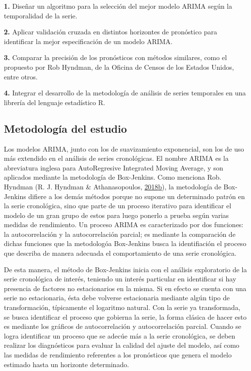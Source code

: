 \documentclass[
]{article}
\begin{document}
\textbf{1.} Diseñar un algoritmo para la selección del mejor modelo
ARIMA según la temporalidad de la serie.

\textbf{2.} Aplicar validación cruzada en distintos horizontes de
pronóstico para identificar la mejor especificación de un modelo ARIMA.

\textbf{3.} Comparar la precisión de los pronósticos con métodos
similares, como el propuesto por Rob Hyndman, de la Oficina de Censos de
los Estados Unidos, entre otros.

\textbf{4.} Integrar el desarrollo de la metodología de análisis de
series temporales en una librería del lenguaje estadístico R.

\subsection{Metodología del estudio}

Los modelos ARIMA, junto con los de suavizamiento exponencial, son los
de uso más extendido en el análisis de series cronológicas. El nombre
ARIMA es la abreviatura inglesa para AutoRegresive Integrated Moving
Average, y son aplicados mediante la metodología de Box-Jenkins. Como
menciona Rob. Hyndman (R. J. Hyndman \& Athanasopoulos,
\protect\hyperlink{ref-hyndman_box-jenkins}{2018}\protect\hyperlink{ref-hyndman_box-jenkins}{b}),
la metodología de Box-Jenkins difiere a los demás métodos porque no
supone un determinado patrón en la serie cronológica, sino que parte de
un proceso iterativo para identificar el modelo de un gran grupo de
estos para luego ponerlo a prueba según varias medidas de rendimiento.
Un proceso ARIMA es caracterizado por dos funciones: la autocorrelación
y la autocorrelación parcial; es mediante la comparación de dichas
funciones que la metodologóa Box-Jenkins busca la identifiación el
proceso que describa de manera adecuada el comportamiento de una serie
cronológica.

De esta manera, el método de Box-Jenkins inicia con el análisis
exploratorio de la serie cronológica de interés, teniendo un interés
particular en identificar si hay presencia de factores no estacionarios
en la misma. Si en efecto se cuenta con una serie no estacionaria, ésta
debe volverse estacionaria mediante algún tipo de transformación,
típicamente el logaritmo natural. Con la serie ya transformada, se busca
identificar el proceso que gobierna la serie, la forma clásica de hacer
esto es mediante los gráficos de autocorrelación y autocorrelación
parcial. Cuando se logra identificar un proceso que se adecúe más a la
serie cronológica, se deben realizar los diagnósticos para evaluar la
calidad del ajuste del modelo, así como las medidas de rendimiento
referentes a los pronósticos que genera el modelo estimado hasta un
horizonte determinado.
\end{document}
